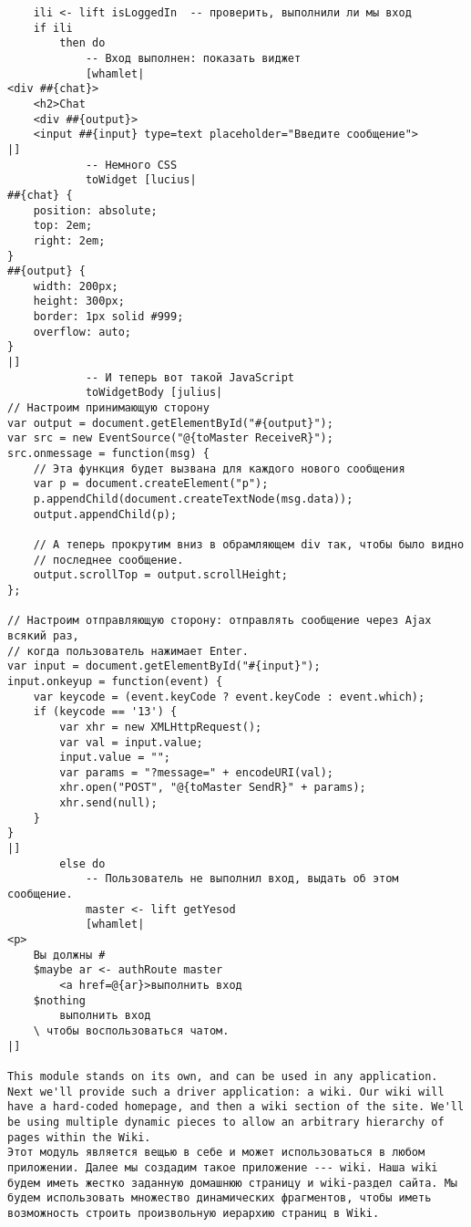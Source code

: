 \begin{lstlisting}
    ili <- lift isLoggedIn  -- проверить, выполнили ли мы вход
    if ili
        then do
            -- Вход выполнен: показать виджет
            [whamlet|
<div ##{chat}>
    <h2>Chat
    <div ##{output}>
    <input ##{input} type=text placeholder="Введите сообщение">
|]
            -- Немного CSS
            toWidget [lucius|
##{chat} {
    position: absolute;
    top: 2em;
    right: 2em;
}
##{output} {
    width: 200px;
    height: 300px;
    border: 1px solid #999;
    overflow: auto;
}
|]
            -- И теперь вот такой JavaScript
            toWidgetBody [julius|
// Настроим принимающую сторону
var output = document.getElementById("#{output}");
var src = new EventSource("@{toMaster ReceiveR}");
src.onmessage = function(msg) {
    // Эта функция будет вызвана для каждого нового сообщения
    var p = document.createElement("p");
    p.appendChild(document.createTextNode(msg.data));
    output.appendChild(p);

    // А теперь прокрутим вниз в обрамляющем div так, чтобы было видно
    // последнее сообщение.
    output.scrollTop = output.scrollHeight;
};

// Настроим отправляющую сторону: отправлять сообщение через Ajax всякий раз,
// когда пользователь нажимает Enter.
var input = document.getElementById("#{input}");
input.onkeyup = function(event) {
    var keycode = (event.keyCode ? event.keyCode : event.which);
    if (keycode == '13') {
        var xhr = new XMLHttpRequest();
        var val = input.value;
        input.value = "";
        var params = "?message=" + encodeURI(val);
        xhr.open("POST", "@{toMaster SendR}" + params);
        xhr.send(null);
    }
}
|]
        else do
            -- Пользователь не выполнил вход, выдать об этом сообщение.
            master <- lift getYesod
            [whamlet|
<p>
    Вы должны #
    $maybe ar <- authRoute master
        <a href=@{ar}>выполнить вход
    $nothing
        выполнить вход
    \ чтобы воспользоваться чатом.
|]

This module stands on its own, and can be used in any application. Next we'll provide such a driver application: a wiki. Our wiki will have a hard-coded homepage, and then a wiki section of the site. We'll be using multiple dynamic pieces to allow an arbitrary hierarchy of pages within the Wiki.
Этот модуль является вещью в себе и может использоваться в любом приложении. Далее мы создадим такое приложение --- wiki. Наша wiki будем иметь жестко заданную домашнюю страницу и wiki-раздел сайта. Мы будем использовать множество динамических фрагментов, чтобы иметь возможность строить произвольную иерархию страниц в Wiki.


\end{lstlisting}
